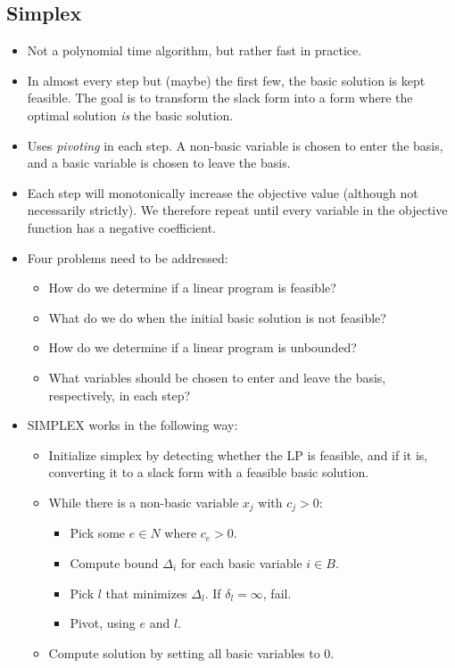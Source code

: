 \subsection{Simplex}
\begin{itemize}
\item Not a polynomial time algorithm, but rather fast in practice.

\item In almost every step but (maybe) the first few, the basic
  solution is kept feasible. The goal is to transform the slack form
  into a form where the optimal solution \emph{is} the basic solution.

\item Uses \emph{pivoting} in each step. A non-basic variable is
  chosen to enter the basis, and a basic variable is chosen to leave
  the basis.

\item Each step will monotonically increase the objective value
  (although not necessarily strictly). We therefore repeat until every
  variable in the objective function has a negative coefficient.

\item Four problems need to be addressed:
  \begin{itemize}
    \item How do we determine if a linear program is feasible?
    \item What do we do when the initial basic solution is not feasible?
    \item How do we determine if a linear program is unbounded?
    \item What variables should be chosen to enter and leave the basis,
      respectively, in each step?
  \end{itemize}

\item SIMPLEX works in the following way:
  \begin{itemize}
  \item Initialize simplex by detecting whether the LP is feasible,
    and if it is, converting it to a slack form with a feasible basic
    solution.
  \item While there is a non-basic variable $x_j$ with $c_j > 0$:
    \begin{itemize}
    \item Pick some $e \in N$ where $c_e > 0$.
    \item Compute bound $\Delta_i$ for each basic variable $i \in B$.
    \item Pick $l$ that minimizes $\Delta_l$. If $\delta_l = \infty$, fail.
    \item Pivot, using $e$ and $l$.
    \end{itemize}
  \item Compute solution by setting all basic variables to $0$.
  \end{itemize}


\end{itemize}
